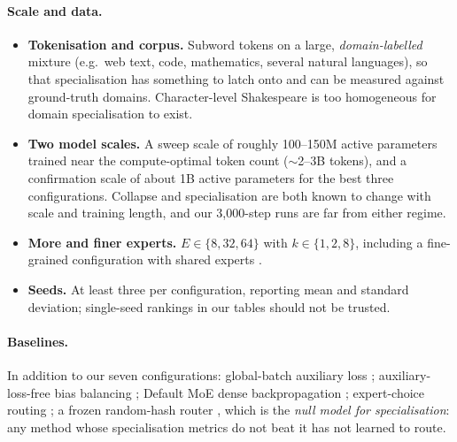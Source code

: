 \documentclass[10pt]{article}
\theoremstyle{definition}
\theoremstyle{remark}
\begin{document}
\paragraph{Scale and data.}
\begin{itemize}
  \item \textbf{Tokenisation and corpus.} Subword tokens on a large, \emph{domain-labelled} mixture (e.g.\ web text, code, mathematics, several natural languages), so that specialisation has something to latch onto and can be measured against ground-truth domains. Character-level Shakespeare is too homogeneous for domain specialisation to exist.
  \item \textbf{Two model scales.} A sweep scale of roughly 100--150M active parameters trained near the compute-optimal token count \citep{hoffmann2022training} ($\sim$2--3B tokens), and a confirmation scale of about 1B active parameters for the best three configurations. Collapse and specialisation are both known to change with scale and training length, and our 3{,}000-step runs are far from either regime.
  \item \textbf{More and finer experts.} $E\in\{8,32,64\}$ with $k\in\{1,2,8\}$, including a fine-grained configuration with shared experts \citep{dai2024deepseekmoe}.
  \item \textbf{Seeds.} At least three per configuration, reporting mean and standard deviation; single-seed rankings in our tables should not be trusted.
\end{itemize}

\paragraph{Baselines.} In addition to our seven configurations: global-batch auxiliary loss \citep{qiu2025demons}; auxiliary-loss-free bias balancing \citep{wang2024auxfree}; Default MoE dense backpropagation \citep{panda2025dense}; expert-choice routing \citep{zhou2022expertchoice}; a frozen random-hash router \citep{roller2021hash}, which is the \emph{null model for specialisation}: any method whose specialisation metrics do not beat it has not learned to route.
\end{document}
